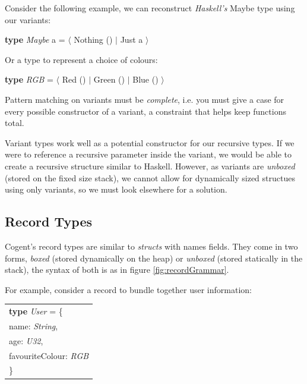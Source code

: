 Consider the following example, we can reconstruct \textit{Haskell's} Maybe type using our variants:

\begin{center}
    \textbf{type} \textit{Maybe} a = $\langle$ Nothing () $\vert$ Just a $\rangle$
\end{center}

Or a type to represent a choice of colours:

\begin{center}
    \textbf{type} \textit{RGB} = $\langle$ Red () $\vert$ Green () $\vert$ Blue () $\rangle$
\end{center}

Pattern matching on variants must be \textit{complete}, i.e. you must give a case for every possible constructor
of a variant, a constraint that helps keep functions total.

Variant types work well as a potential constructor for our recursive types. If we were to reference a
recursive parameter inside the variant, we would be able to create a recursive structure similar to Haskell.
However, as variants are \textit{unboxed} (stored on the fixed size stack), we cannot allow for dynamically sized structues
using only variants, so we must look elsewhere for a solution.

\subsection{Record Types}

Cogent's record types are similar to \textit{structs} with names fields. They come in two forms, \textit{boxed}
(stored dynamically on the heap) or \textit{unboxed} (stored statically in the stack), the syntax of both is
as in figure \ref{fig:recordGrammar}.

For example, consider a record to bundle together user information:

\begin{center}
    \begin{tabular}{l}
    \textbf{type} \textit{User} = \{ \\
                    \hspace{1.5em} name: \textit{String},\\
                    \hspace{1.5em} age: \textit{U32}, \\
                    \hspace{1.5em} favouriteColour: \textit{RGB}\\
                    \} \\
    \end{tabular}
\end{center}

